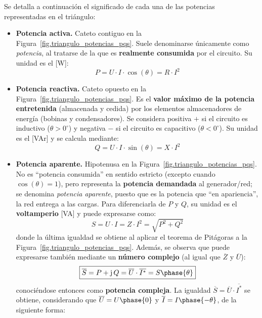 \documentclass[11pt]{book} %
\numberwithin{dummy}{section}
\theoremstyle{ocrenumbox}
\theoremstyle{blacknumex}
\theoremstyle{blacknumbox}
\theoremstyle{ocrenum}
\begin{document}
	Se detalla a continuación el significado de cada una de las potencias representadas en el triángulo: 
	\begin{itemize}
		\item \textbf{Potencia activa.} Cateto contiguo en la Figura~\ref{fig.triangulo_potencias_pqs}. Suele denominarse únicamente como \textit{potencia}, al tratarse de la que es \textbf{realmente consumida} por el circuito. Su unidad es el [W]:
		\begin{equation}\label{eq.Pactiva}
			\boxed{P = U\cdot I\cdot\cos(\theta) = R \cdot I^2}
		\end{equation}
		\item \textbf{Potencia reactiva.} Cateto opuesto en la Figura~\ref{fig.triangulo_potencias_pqs}. Es el \textbf{valor máximo de la potencia entretenida} (almacenada y cedida) por los elementos almacenadores de energía (bobinas y condensadores). Se considera positiva $+$ si el circuito es inductivo ($\theta>0^\circ$) y negativa $-$ si el circuito es capacitivo ($\theta<0^\circ$). Su unidad es el [VAr] y se calcula mediante: 
		\begin{equation}\label{eq.Qreactiva}
			\boxed{Q = U\cdot I\cdot\sin(\theta) = X \cdot I^2}
		\end{equation}
		\item \textbf{Potencia aparente.} Hipotenusa en la Figura~\ref{fig.triangulo_potencias_pqs}. No es ``potencia consumida'' en sentido estricto (excepto cuando $\cos(\theta)=1$), pero representa la \textbf{potencia demandada} al generador/red; se denomina \textit{potencia aparente}, puesto que es la potencia que ``en apariencia'', la red entrega a las cargas. Para diferenciarla de $P$ y $Q$, su unidad es el \textbf{voltamperio} [VA] y puede expresarse como: 
		\begin{equation}\label{eq.Saparente}
			\boxed{S = U\cdot I= Z \cdot I^2=\sqrt{P^2+Q^2}}
		\end{equation}
		donde la última igualdad se obtiene al aplicar el teorema de Pitágoras a la Figura~\ref{fig.triangulo_potencias_pqs}. Además, se observa que puede expresarse también mediante un \textbf{número complejo} (al igual que $\overline{Z}$ y $\overline{U}$): 
		\begin{equation}
			\boxed{\overline{S}=P+\mathrm{j}\,Q=\overline{U}\cdot \overline{I^*}=S\phase{\theta}}
		\end{equation}
		conociéndose entonces como \textbf{potencia compleja}. La igualdad $\overline{S}=\overline{U}\cdot \overline{I^*}$ se obtiene, considerando que $\overline{U} = U\phase{0}$ y $\overline{I} = I\phase{-\theta}$, de la siguiente forma: 

\end{itemize}
\end{document}
